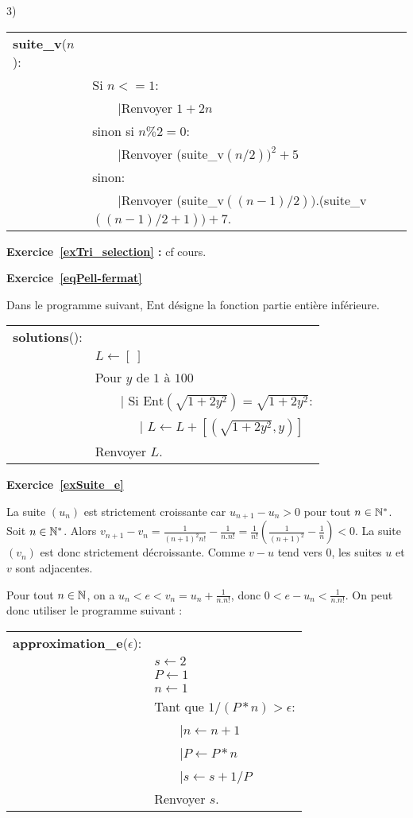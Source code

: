 \documentclass[10pt,a4paper]{article}
\begin{document}
3) \begin{tabular}{ll}
\textbf{suite\_v}($n$):\\

& Si $n<=1$:\\
&\ \ \ {\ \rm |}Renvoyer $1+2n$\\
& sinon si $n\%2=0$:\\
&\ \ \ {\ \rm |}Renvoyer (suite\_v$(n/2))^2+5$\\
& sinon:\\
&\ \ \ {\ \rm |}Renvoyer (suite\_v$((n-1)/2))$.(suite\_v$((n-1)/2+1))+7$.\\
\end{tabular}

\textbf{Exercice~\ref{exTri_selection} : }cf cours.


\textbf{Exercice~\ref{eqPell-fermat}}

Dans le programme suivant, $\mathrm{Ent}$ désigne la fonction partie entière inférieure. 

\begin{tabular}{ll}
\textbf{solutions}():\\
&$L\leftarrow [\ ]$\\
& Pour $y$ de $1$ à $100$\\
& \ \ \ {\ \rm |} Si $\mathrm{Ent}(\sqrt{1+2y^2})=\sqrt{1+2y^2}$:\\
& \ \ \ \ \ \ {\ \rm |} $L\leftarrow L+[(\sqrt{1+2y^2},y)]$\\
& Renvoyer $L$.\\
\end{tabular}


\textbf{Exercice~\ref{exSuite_e}}

La suite $(u_n)$ est strictement croissante car $u_{n+1}-u_n>0$ pour tout $n\in \mathbb{N}^*$. Soit $n\in \mathbb{N}^*$. Alors $v_{n+1}-v_n=\frac{1}{(n+1)^2 n!}-\frac{1}{n.n!}=\frac{1}{n!}(\frac{1}{(n+1)^2}-\frac{1}{n})<0$. La suite $(v_n)$ est donc strictement décroissante. Comme $v-u$ tend vers $0$, les suites $u$ et $v$ sont adjacentes.


Pour tout $n\in \mathbb{N}$, on a $u_n< e <v_n=u_n+\frac{1}{n.n!}$, donc $0<e-u_n<\frac{1}{n.n!}$. On peut donc utiliser le programme suivant :


\begin{tabular}{ll}
\textbf{approximation\_e}($\epsilon$):\\
& $s\leftarrow 2$\\
& $P\leftarrow 1$\\
& $n\leftarrow 1$\\
& Tant que $1/(P*n)>\epsilon$:\\
& \ \ \ {\ \rm |}$n\leftarrow n+1$\\
& \ \ \ {\ \rm |}$P\leftarrow P*n$\\
& \ \ \ {\ \rm |}$s\leftarrow s+1/P$\\
& Renvoyer $s$. 
\end{tabular}
\end{document}
